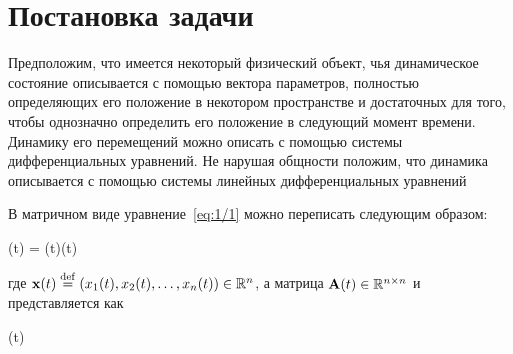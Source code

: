 


\chapter{Постановка задачи}
\newcommand{\funcF}{ \calf{F}         } %
\newcommand{\optF}{  \optimum{\funcF} } %



Предположим, что имеется некоторый физический объект, чья динамическое состояние описывается с помощью вектора параметров, полностью определяющих его положение в некотором пространстве и достаточных для того, чтобы однозначно определить его положение в следующий момент времени. Динамику его перемещений можно описать с помощью системы дифференциальных уравнений. Не нарушая общности положим, что динамика описывается с помощью системы линейных дифференциальных уравнений

\eeq

В матричном виде уравнение~\ref{eq:1/1} можно переписать следующим образом:

    (t) = (t)(t) \text{,}
\eeq

где $\mathbf{x}(t) \stackrel{ \mathrm{def} }{=} (x_1(t), x_2(t), \ldots, x_n(t)) \in \mathbb{R}^{n}$, а матрица $\mathbf{A}(t) \in \mathbb{R}^{{n} \times {n}}$ и представляется как

\beqn
    (t) \eqdef {} 
\eeqn

